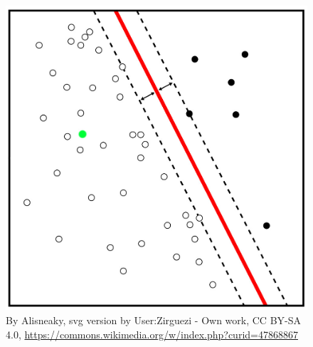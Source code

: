 \documentclass[12pt]{book} %
\begin{document}
\begin{figure}
  \centering
  \includegraphics[width=0.95\linewidth]{images/Libro-img045.jpg}
  \begin{minipage}{\linewidth}
    \caption{By Alisneaky, svg version by User:Zirguezi - Own work,
CC BY-SA 4.0, \protect\url{https://commons.wikimedia.org/w/index.php?curid=47868867} }
  \end{minipage}
\end{figure}
\end{document}
